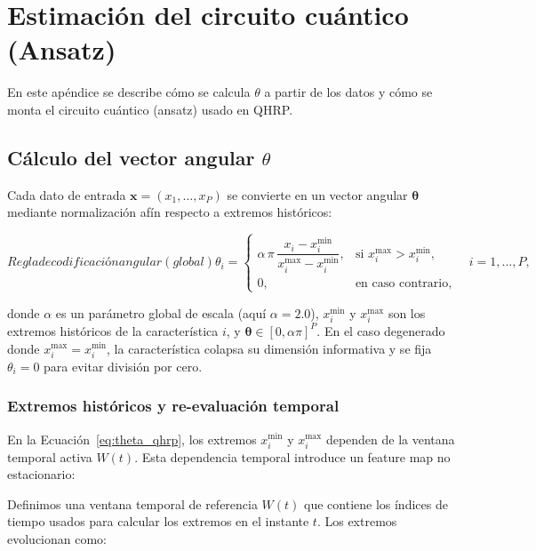 \chapter{Estimación del circuito cuántico (Ansatz)}
\label{ap:estimacion_ansatz}

En este apéndice se describe cómo se calcula $\theta$ a partir de los datos y cómo se monta el circuito cuántico (ansatz) usado en QHRP.

\section[Cálculo del vector angular theta]{Cálculo del vector angular $\theta$}
\label{ap:calculo_theta}

Cada dato de entrada $\mathbf{x} = (x_1, \dots, x_P)$ se convierte en un vector angular $\boldsymbol{\theta}$ mediante normalización afín respecto a extremos históricos:

\begin{equation}[eq:theta_qhrp]{Regla de codificación angular (global)}
\theta_i =
\begin{cases}
\alpha\,\pi\,\dfrac{x_i - x_i^{\min}}{x_i^{\max} - x_i^{\min}}, & \text{si } x_i^{\max} > x_i^{\min}, \\
0, & \text{en caso contrario},
\end{cases}
\quad i = 1, \dots, P,
\end{equation}

donde $\alpha$ es un parámetro global de escala (aquí $\alpha=2.0$), $x_i^{\min}$ y $x_i^{\max}$ son los extremos históricos de la característica $i$, y $\boldsymbol{\theta}\in[0,\alpha\pi]^P$. En el caso degenerado donde $x_i^{\max}=x_i^{\min}$, la característica colapsa su dimensión informativa y se fija $\theta_i=0$ para evitar división por cero.

\subsection[Extremos históricos y re-evaluación temporal]{Extremos históricos y re-evaluación temporal}
\label{ap:extremos_reevaluacion}

En la Ecuación~\eqref{eq:theta_qhrp}, los extremos $x_i^{\min}$ y $x_i^{\max}$ dependen de la ventana temporal activa $W(t)$. Esta dependencia temporal introduce un feature map no estacionario:

Definimos una ventana temporal de referencia $W(t)$ que contiene los índices de tiempo usados para calcular los extremos en el instante $t$. Los extremos evolucionan como:

